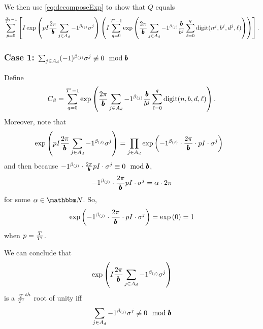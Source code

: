
We then use \eqref{eq:decomposeExp} to show that $Q$ equals
\begin{equation}
\label{eq:inner-outer-split}
  \sum_{p= 0}^{\frac{T}{{T}'} - 1} \left[
    I \exp\left(
      pI \frac{2\pi}{{\pmb{b}}} \sum_{j \in A_d} -1 ^ {\beta_{(j)}}
      \sigma^j
    \right)
  \left(
  I \sum_{q = 0}^{{T}' - 1}
    \exp\left(
        \frac{2\pi}{{\pmb{b}}}
        \sum_{j \in A_d} -1 ^ {\beta_{(j)}} \frac{{\pmb{b}}}{b^j}
          \sum_{\ell = 0}^{q}\mathrm{digit}(n^j, b^j, d^j, \ell)
    \right)\right)\right].
\end{equation}

\subsubsection*{Case 1: $\sum_{j \in A_d} (-1) ^ {\beta_{(j)}} \sigma^j \not\equiv 0 \mod {{\pmb{b}}}$}
Define
$$
  C_\beta = \sum_{q = 0}^{{T}' - 1}
  \exp\left(
      \frac{2\pi}{{\pmb{b}}}
      \sum_{j \in A_d} -1 ^ {\beta_{(j)}} \frac{{\pmb{b}}}{b^j}
        \sum_{\ell = 0}^{q}\mathrm{digit}(n, b, d, \ell)
  \right).
$$
Moreover, note that 
\begin{align*}
  &\exp\left(
      pI \frac{2\pi}{{\pmb{b}}} \sum_{j \in A_d} -1 ^ {\beta_{(j)}}
      \sigma^j
    \right)
  = \prod_{j \in A_d} \exp\left(
      -1^{\beta_{(j)}}
     \cdot
    	\frac{2\pi}{{\pmb{b}}}
     \cdot
      pI \cdot \sigma^j 
    \right)
\end{align*}
and then  because $-1^{\beta_{(j)}} \cdot \frac{2\pi}{{\pmb{b}}} pI \cdot \sigma^j \equiv 0 \mod {{\pmb{b}}}$,
\begin{equation*}
   -1^{\beta_{(j)}} \cdot \frac{2\pi}{{\pmb{b}}} pI \cdot \sigma^j = \alpha \cdot 2\pi
\end{equation*}
for some $\alpha \in \N$. So,
\begin{equation*}
  \exp\left(-1^{\beta_{(j)}} \cdot\frac{2\pi}{{\pmb{b}}} \cdot pI \cdot \sigma^j \right) = \exp\left(0\right) = 1
\end{equation*}
when $p = \frac{T}{{T}'}$. 


We can conclude that
\begin{equation*}
 \exp\left(
      I \frac{2\pi}{{\pmb{b}}} \sum_{j \in A_d} -1 ^ {\beta_{(j)}}
      \sigma^j
    \right) 
\end{equation*}
is a $\frac{T}{{T}'}^{th}$ root of unity iff
$$\sum_{j \in A_d} -1 ^ {\beta_{(j)}}
      \sigma^j \not\equiv 0 \mod {{\pmb{b}}}
$$

